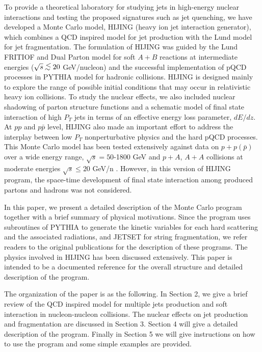         To provide a theoretical laboratory for studying 
jets in high-energy nuclear interactions and testing the
proposed signatures such as jet quenching\cite{gyu89}, 
we have developed  a Monte Carlo model, 
HIJING (heavy ion jet interaction generator)\cite{hijing},
which combines a QCD inspired model for jet production with the 
Lund model\cite{lund} for jet fragmentation. 
The formulation of HIJING was guided by the Lund FRITIOF\cite{fritiof}
and Dual Parton model\cite{dpm} for soft $A+B$ reactions at
intermediate energies ($\sqrt{s}\lsim 20$ GeV/nucleon) and
the successful implementation of pQCD processes in 
PYTHIA\cite{sjostrand,pythia}
model for hadronic collisions. HIJING is designed
mainly to explore the range of possible initial conditions
that may occur in relativistic heavy ion collisions. To study
the nuclear effects, we also included nuclear shadowing\cite{shadow1}
of parton structure functions and a schematic model of final
state interaction of high $P_T$ jets in terms of an effective
energy loss parameter, $dE/dz$\cite{wang92a,gyu92}. 
At $pp$ and $p\bar{p}$ level,
HIJING also made an important effort to address the interplay
between low $P_T$ nonperturbative physics and the hard pQCD
processes. This Monte Carlo model has been tested extensively
against data on $p+p(\bar{p})$ over a wide energy range,
$\sqrt{s}=50$-1800 GeV and $p+A$, $A+A$ collisions at moderate
energies $\sqrt{s}\leq 20$  GeV/n \cite{hijing,hijingpp}.
However, in this version of HIJING program, the space-time
development of final state interaction among produced 
partons\cite{geiger} and hadrons was not considered.

        In this paper, we present a detailed description of
the Monte Carlo program together with a brief summary of
physical motivations. Since the program uses subroutines
of PYTHIA to generate the kinetic variables for each
hard scattering and the associated radiations, and JETSET
for string fragmentation, we refer readers to the original 
publications\cite{pythia,jetset} for the description of these 
programs. The physics involved in HIJING has been discussed
extensively\cite{hijing,hijingpp,wang92a}. This paper is 
intended to be a documented
reference for the overall structure and detailed description
of the program.

        The organization of the paper is as the following. 
In Section 2, we give a brief review of the QCD inspired model 
for multiple jets production and soft interaction in 
nucleon-nucleon collisions. The nuclear effects on jet
production and fragmentation are discussed in Section 3. 
Section 4 will give a detailed description of the program.
Finally in Section 5 we will give instructions on how to 
use the program and some simple examples are provided.  

